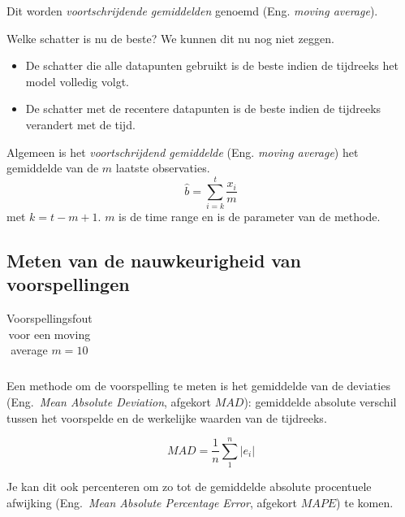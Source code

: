 Dit worden \textit{voortschrijdende gemiddelden} genoemd (Eng. \emph{moving average}). 

Welke schatter is nu de beste? We kunnen dit nu nog niet zeggen.

\begin{itemize}
\item De schatter die alle datapunten gebruikt is de beste indien de tijdreeks het model volledig volgt.
\item De schatter met de recentere datapunten is de beste indien de tijdreeks verandert met de tijd.
\end{itemize}

\begin{definition}
Algemeen is het \emph{voortschrijdend gemiddelde} (Eng. \emph{moving average}) het gemiddelde van de $m$ laatste observaties.
\begin{equation}
	\widehat{b} = \sum_{i=k}^{t} \frac{x_{i}}{m}
\label{eq:movingAverage}
\end{equation}
met $k = t-m+1$. $m$ is de time range en is de parameter van de methode.
\end{definition}

\subsection{Meten van de nauwkeurigheid van voorspellingen}

\begin{table}
  \centering
\begin{tabular}{|lllllllllll|}

\end{tabular}
\caption{Voorspellingsfout voor een moving average $m = 10$}
\label{tab:error}
\end{table}


Een methode om de voorspelling te meten is het gemiddelde van de deviaties (Eng.~\emph{Mean Absolute Deviation}, afgekort $MAD$): gemiddelde absolute verschil tussen het voorspelde en de werkelijke waarden van de tijdreeks.

\begin{definition}[$MAD$]
\begin{equation}
	MAD = \frac{1}{n} \sum_{1}^{n} \left| e_{i} \right|  
\label{eq:MAD}
\end{equation}
\end{definition}

Je kan dit ook percenteren om zo tot de gemiddelde absolute procentuele afwijking (Eng.~\emph{Mean Absolute Percentage Error}, afgekort $MAPE$) te komen.

